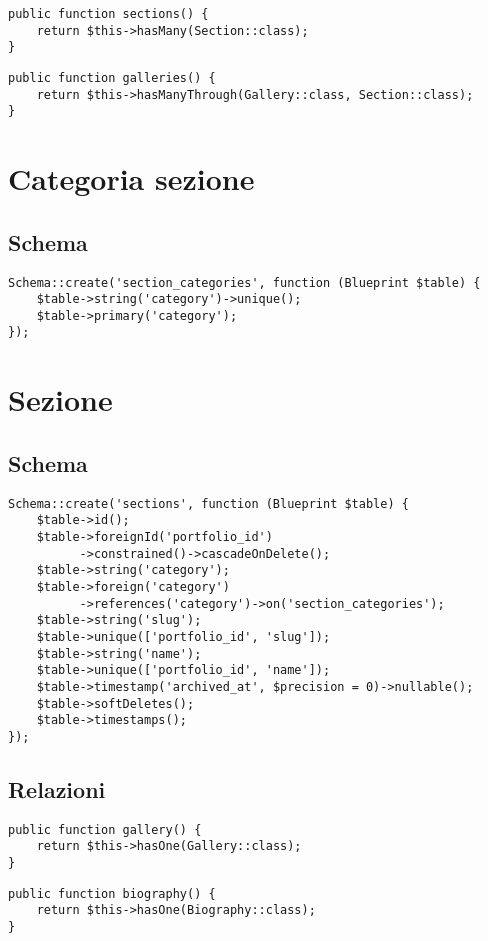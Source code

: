 \begin{lstlisting}
public function sections() {
	return $this->hasMany(Section::class);
}
\end{lstlisting}

\begin{lstlisting}
public function galleries() {
	return $this->hasManyThrough(Gallery::class, Section::class);
}
\end{lstlisting}

\section{Categoria sezione}
\subsection{Schema}
\begin{lstlisting}
Schema::create('section_categories', function (Blueprint $table) {
	$table->string('category')->unique();
	$table->primary('category');
});
\end{lstlisting}

\section{Sezione}
\subsection{Schema}
\begin{lstlisting}
Schema::create('sections', function (Blueprint $table) {
	$table->id();
	$table->foreignId('portfolio_id')
	      ->constrained()->cascadeOnDelete();
	$table->string('category');
	$table->foreign('category')
	      ->references('category')->on('section_categories');
	$table->string('slug');
	$table->unique(['portfolio_id', 'slug']);
	$table->string('name');
	$table->unique(['portfolio_id', 'name']);
	$table->timestamp('archived_at', $precision = 0)->nullable();
	$table->softDeletes();
	$table->timestamps();
});
\end{lstlisting}
\subsection{Relazioni}
\begin{lstlisting}
public function gallery() {
	return $this->hasOne(Gallery::class);
}
\end{lstlisting}

\begin{lstlisting}
public function biography() {
	return $this->hasOne(Biography::class);
}

\end{lstlisting}

